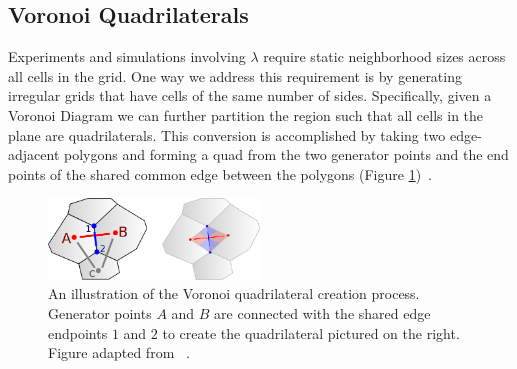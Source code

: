 \documentclass[a4paper,11pt]{report}
\begin{document}
\subsection{Voronoi Quadrilaterals}

Experiments and simulations involving $\lambda$ require static neighborhood sizes across all cells in the grid. One way we address this requirement is by generating irregular grids that have cells of the same number of sides. Specifically, given a Voronoi Diagram we can further partition the region such that all cells in the plane are quadrilaterals. This conversion is accomplished by taking two edge-adjacent polygons and forming a quad from the two generator points and the end points of the shared common edge between the polygons (Figure \ref{fig:vquad_gen})~\cite{am10}.

\begin{figure}[htp]
\centering
\includegraphics[width=0.5\textwidth]{vquad_generation}
\caption[Voronoi Quad Generation]{
	An illustration of the Voronoi quadrilateral creation process. Generator points $A$ and $B$ are connected with the shared edge endpoints $1$ and $2$ to create the quadrilateral pictured on the right. Figure adapted from \citeauthor{am10}~\cite{am10}. 
}
\label{fig:vquad_gen}
\end{figure}



\processdelayedfloats
\end{document}
